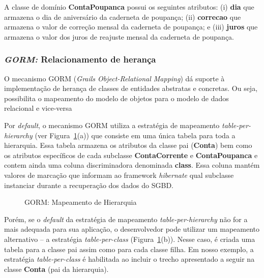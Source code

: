 A classe de domínio {\bf  ContaPoupanca} possui os seguintes atributos: (i) {\bf
  dia} que  armazena o dia  de aniversário da  caderneta de poupança;  (ii) {\bf
  correcao} que armazena o valor de  correção mensal da caderneta de poupança; e
(iii) {\bf juros} que armazena o valor dos juros de reajuste mensal da caderneta
de poupança.

\newpage

\subsubsection{{\it GORM:} Relacionamento de herança}
\label{secGORM}

\vspace{0.5cm}

O  mecanismo  GORM  ({\it   Grails  Object-Relational  Mapping})  dá  suporte  à
implementação de herança de classes de entidades abstratas e concretas. Ou seja,
possibilita o mapeamento do modelo de  objetos para o modelo de dados relacional
e vice-versa

\vspace{0.2cm}

Por  {\it default}, o  mecanismo GORM  utiliza a  estratégia de  mapeamento {\it
  table-per-hierarchy} (ver  Figura~\ref{gormFig}(a)) que consiste  em uma única
tabela para toda a hierarquia.  Essa  tabela armazena os atributos da classe pai
({\bf  Conta})  bem  como  os  atributos  específicos  de  cada  subclasse  {\bf
  ContaCorrente} e {\bf ContaPoupanca}  e contem ainda uma coluna discriminadora
denominada {\bf class}.  Essa coluna  mantém valores de marcação que informam ao
framework {\it  hibernate} qual subclasse  instanciar durante a  recuperação dos
dados do SGBD.

\begin{figure}[h]
\center
{}
\qquad
{}
\caption{GORM: Mapeamento de Hierarquia}
\label{gormFig}
\end{figure}

Porém, se o {\it default}  da estratégia de mapeamento {\it table-per-hierarchy}
não for  a mais adequada  para sua aplicação,  o desenvolvedor pode  utilizar um
mapeamento    alternativo     --    a    estratégia     {\it    table-per-class}
(Figura~\ref{gormFig}(b)). Nesse  caso, é  criada uma tabela  para a  classe pai
assim  como  para  cada  classe  filha.  Em nosso  exemplo,  a  estratégia  {\it
  table-per-class}  é habilitada  ao incluir  o trecho  apresentado a  seguir na
classe {\bf Conta} (pai da hierarquia).

